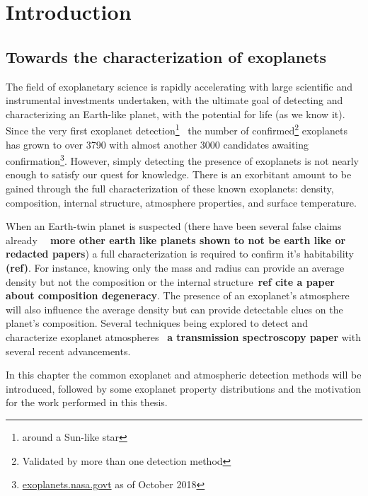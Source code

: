 \chapter{Introduction}\label{cha:introduction}


\section{Towards the characterization of exoplanets}

The field of exoplanetary science is rapidly accelerating with large scientific and instrumental investments undertaken, with the ultimate goal of detecting and characterizing an Earth-like planet, with the potential for life (as we know it).
Since the very first exoplanet detection\footnote{around a Sun-like star}~\citep{mayor_jupitermass_1995} the number of confirmed\footnote{Validated by more than one detection method} exoplanets has grown to over 3790 with almost another 3000 candidates awaiting confirmation\footnote{\href{https://exoplanets.nasa.gov/}{exoplanets.nasa.govt} as of October 2018}.
However, simply detecting the presence of exoplanets is not nearly enough to satisfy our quest for knowledge.
There is an exorbitant amount to be gained through the full characterization of these known exoplanets: density, composition, internal structure, atmosphere properties, and surface temperature.

When an Earth-twin planet is suspected (there have been several false claims already \textbf{~\citep[e.g.][]{mullally_kepler_2018} \textbf{more} other earth like planets shown to not be earth like or redacted papers}) a full characterization is required to confirm it's habitability \textbf{(ref)}.
For instance, knowing only the mass and radius can provide an average density but not the composition or the internal structure~\textbf{ref cite {a paper about composition degeneracy}}.
The presence of an exoplanet's atmosphere will also influence the average density but can provide detectable clues on the planet's composition.
Several techniques being explored to detect and characterize exoplanet atmospheres~\citep[e.g.][]{snellen_orbital_2010, martins_reflected_2016, piskorz_evidence_2016} \textbf{a transmission spectroscopy paper} with several recent advancements.

In this chapter the common exoplanet and atmospheric detection methods will be introduced, followed by some exoplanet property distributions and the motivation for the work performed in this thesis.\\


